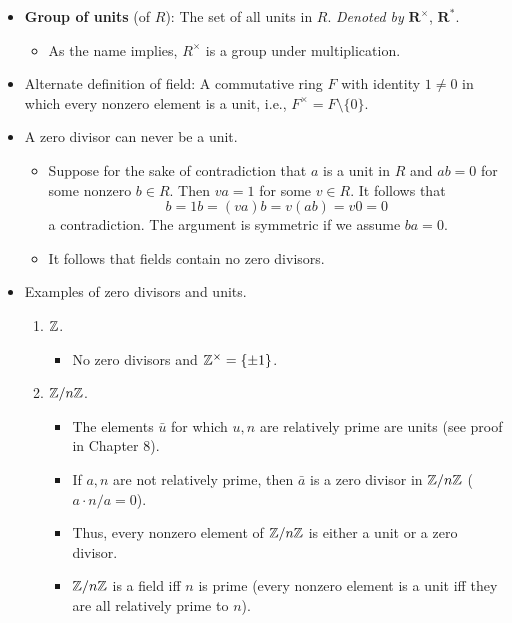\documentclass[../notes.tex]{subfiles}
\begin{document}
\begin{itemize}
\begin{itemize}
    \end{itemize}
    \item \textbf{Group of units} (of $R$): The set of all units in $R$. \emph{Denoted by} $\bm{R^\times}$, $\bm{R^*}$.
    \begin{itemize}
        \item As the name implies, $R^\times$ is a group under multiplication.
    \end{itemize}
    \item Alternate definition of field: A commutative ring $F$ with identity $1\neq 0$ in which every nonzero element is a unit, i.e., $F^\times=F\setminus\{0\}$.
    \item A zero divisor can never be a unit.
    \begin{itemize}
        \item Suppose for the sake of contradiction that $a$ is a unit in $R$ and $ab=0$ for some nonzero $b\in R$. Then $va=1$ for some $v\in R$. It follows that
        \begin{equation*}
            b = 1b = (va)b = v(ab) = v0 = 0
        \end{equation*}
        a contradiction. The argument is symmetric if we assume $ba=0$.
        \item It follows that fields contain no zero divisors.
    \end{itemize}
    \item Examples of zero divisors and units.
    \begin{enumerate}
        \item $\mathbb{Z}$.
        \begin{itemize}
            \item No zero divisors and $\mathbb{Z}^\times=\{\pm 1\}$.
        \end{itemize}
        \item $\mathbb{Z}/n\mathbb{Z}$.
        \begin{itemize}
            \item The elements $\bar{u}$ for which $u,n$ are relatively prime are units (see proof in Chapter 8).
            \item If $a,n$ are not relatively prime, then $\bar{a}$ is a zero divisor in $\mathbb{Z}/n\mathbb{Z}$ ($a\cdot n/a=0$).
            \item Thus, every nonzero element of $\mathbb{Z}/n\mathbb{Z}$ is either a unit or a zero divisor.
            \item $\mathbb{Z}/n\mathbb{Z}$ is a field iff $n$ is prime (every nonzero element is a unit iff they are all relatively prime to $n$).
        \end{itemize}

\end{enumerate}
\end{itemize}
\end{document}
